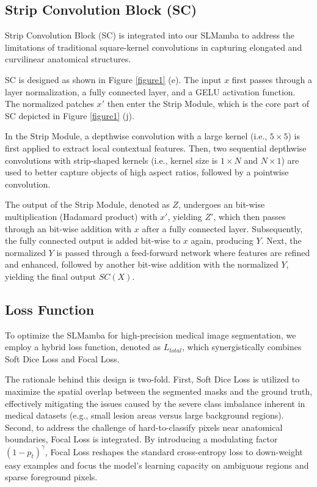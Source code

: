 \documentclass[runningheads]{llncs}
\begin{document}
\subsection{Strip Convolution Block (SC)}

Strip Convolution Block (SC)\cite{hou2020strip,liu2023slak,chu2021active} is integrated into our SLMamba to address the limitations of traditional square-kernel convolutions in capturing elongated and curvilinear anatomical structures.

SC is designed as shown in Figure \textcolor{red}{\ref{figure1}} (e). The input $x$ first passes through a layer normalization, a fully connected layer, and a GELU activation function\cite{hendrycks2016gelu}. The normalized patches $x'$ then enter the Strip Module, which is the core part of SC depicted in Figure \textcolor{red}{\ref{figure1}} (j).

In the Strip Module, a depthwise convolution with a large kernel (i.e., $5 \times 5$) is first applied to extract local contextual features. Then, two sequential depthwise convolutions with strip-shaped kernels (i.e., kernel size is $1 \times N$ and $N \times 1$) are used to better capture objects of high aspect ratios, followed by a pointwise convolution.

The output of the Strip Module, denoted as $Z$, undergoes an bit-wise multiplication (Hadamard product) with $x'$, yielding $Z'$, which then passes through an bit-wise addition with $x$ after a fully connected layer. Subsequently, the fully connected output is added bit-wise to $x$ again, producing $Y$. Next, the normalized $Y$ is passed through a feed-forward network where features are refined and enhanced, followed by another bit-wise addition with the normalized $Y$, yielding the final output $SC(X)$.


\subsection{Loss Function}

To optimize the SLMamba for high-precision medical image segmentation, we employ a hybrid loss function, denoted as $L_{total}$, which synergistically combines Soft Dice Loss and Focal Loss.

The rationale behind this design is two-fold. First, Soft Dice Loss is utilized to maximize the spatial overlap between the segmented masks and the ground truth, effectively mitigating the issues caused by the severe class imbalance inherent in medical datasets (e.g., small lesion areas versus large background regions). Second, to address the challenge of hard-to-classify pixels near anatomical boundaries, Focal Loss is integrated. By introducing a modulating factor $(1 - p_t)^\gamma$, Focal Loss reshapes the standard cross-entropy loss to down-weight easy examples and focus the model's learning capacity on ambiguous regions and sparse foreground pixels.
\end{document}
